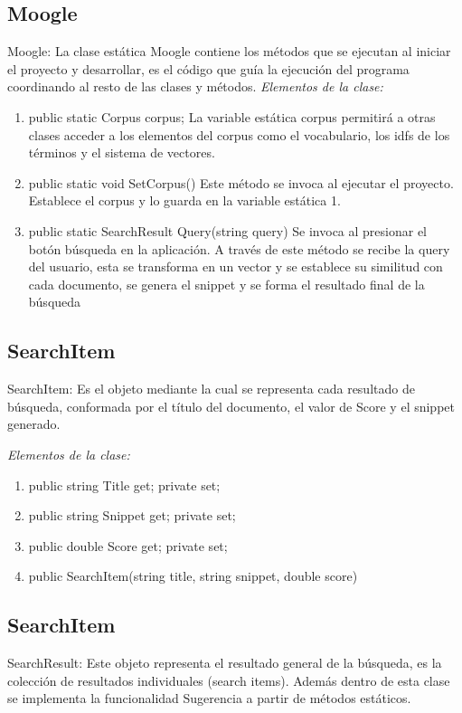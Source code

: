 \documentclass[a4paper,12pt]{article}
\begin{document}
\subsection{Moogle}
Moogle: La clase estática Moogle contiene los métodos que se ejecutan al iniciar el
proyecto y desarrollar, es el código que guía la ejecución del programa coordinando al
resto de las clases y métodos.
\emph{Elementos de la clase:}
\begin{enumerate}

\item public static Corpus corpus;
    La variable estática corpus permitirá a otras clases acceder a los elementos del
    corpus como el vocabulario, los idfs de los términos y el sistema de vectores.
\item public static void SetCorpus()
    Este método se invoca al ejecutar el proyecto. Establece el corpus y lo guarda en
    la variable estática 1.
\item public static SearchResult Query(string query)
    Se invoca al presionar el botón búsqueda en la aplicación. A través de este método
    se recibe la query del usuario, esta se transforma en un vector y se establece su
    similitud con cada documento, se genera el snippet y se forma el resultado final de
    la búsqueda
\end{enumerate}

\subsection{SearchItem}
SearchItem: Es el objeto mediante la cual se representa cada resultado de búsqueda,
conformada por el título del documento, el valor de Score y el snippet generado.

\emph{Elementos de la clase:}
\begin{enumerate}
    \item public string Title { get; private set; }
    \item public string Snippet { get; private set; }
    \item public double Score { get; private set; }
    \item public SearchItem(string title, string snippet, double score)
\end{enumerate}


\subsection{SearchItem}
SearchResult: Este objeto representa el resultado general de la búsqueda, es la
colección de resultados individuales (search items). Además dentro de esta clase se
implementa la funcionalidad Sugerencia a partir de métodos estáticos.
\end{document}
